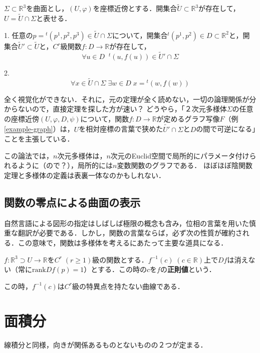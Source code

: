 \documentclass[uplatex, dvipdfmx]{jsreport}
\begin{document}
\begin{proposition}
    $\Sigma\subset\mathbb{R}^3$を曲面とし，$(U,\varphi)$を座標近傍とする．開集合$\tilde{U}\subset\mathbb{R}^3$が存在して，$U=\tilde{U}\cap\Sigma$と表せる．

    1. 任意の$p={}^t(p^1,p^2,p^3)\in \tilde{U}\cap\Sigma$について，開集合${}^t(p^1,p^2)\in D\subset\mathbb{R}^2$と，開集合$\tilde{U}'\subset\tilde{U}$と，$C^r$級関数$f:D\to\mathbb{R}$が存在して，
    \[ \forall u\in D\;\; {}^t(u,f(u))\in \tilde{U}'\cap\Sigma \]

    2. 
    \[ \forall x\in\tilde{U}\cap\Sigma\; \exists w\in D\; x={}^t(w,f(w)) \]
\end{proposition}
\begin{remark}
    全く視覚化ができない．それに，元の定理が全く読めない，一切の論理関係が分からないので，直接定理を探した方が速い？
    どうやら，「２次元多様体$\Sigma$の任意の座標近傍$(U,\varphi,D,\psi)$について，関数$f:D\to\mathbb{R}$が定めるグラフ写像$F$（例\ref{example-graph}）は，$U$を相対座標の言葉で狭めた$\tilde{U'}\cap\Sigma$と$D$の間で可逆になる」ことを主張している．

    この論法では，$n$次元多様体は，$n$次元のEuclid空間で局所的にパラメータ付けられるように（ので？），局所的には$n$変数関数のグラフである．
    ほぼほぼ陰関数定理と多様体の定義は表裏一体なのかもしれない．
\end{remark}

\section{関数の零点による曲面の表示}

自然言語による図形の指定はしばしば極限の概念も含み，位相の言葉を用いた慎重な翻訳が必要である．しかし，関数の言葉ならば，必ず次の性質が確約される．この意味で，関数は多様体を考えるにあたって主要な道具になる．

\begin{theorem}
    $f:\mathbb{R}^3\supset U\to\mathbb{R}$を$C^r\;(r\ge 1)$級の関数とする．$f^{-1}(c)\; (c\in\mathbb{R})$上で$Df$は消えない（常に$\mathrm{rank}Df(p)=1$）とする．この時の$c$を$f$の\textbf{正則値}という．

    この時，$f^{-1}(c)$は$C^r$級の特異点を持たない曲線である．
\end{theorem}

\chapter{面積分}
線積分と同様，向きが関係あるものとないものの２つが定まる．
\end{document}
